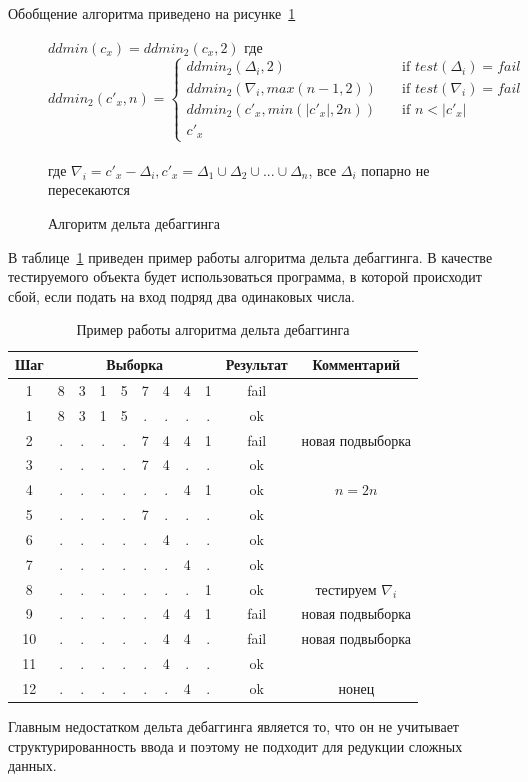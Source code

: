 Обобщение алгоритма приведено на рисунке~\ref{ddminalg}
\begin{figure}
	$ddmin(c_x) = ddmin_2(c_x, 2)$ где \\
\[ ddmin_2(c'_x, n) =
  \begin{cases}
    ddmin_2(\Delta_i, 2)       & \quad \text{if } test(\Delta_i) = fail\\
    ddmin_2(\nabla_i, max(n - 1, 2))       & \quad \text{if } test(\nabla_i) = fail\\
    ddmin_2(c'_x, min(|c'_x|, 2n))       & \quad \text{if } n < |c'_x|\\
    c'_x
  \end{cases}
\]
\\
где $\nabla_i = c'_x - \Delta_i, c'_x = \Delta_1 \cup \Delta_2 \cup ... \cup \Delta_n$, все $\Delta_i$ попарно не пересекаются
\caption{Алгоритм дельта дебаггинга}
\label{ddminalg}
\end{figure}
В таблице~\ref{tab:ddminex2} приведен пример работы алгоритма дельта дебаггинга. В качестве тестируемого объекта будет использоваться программа, в которой происходит сбой, если подать на вход подряд два одинаковых числа.
\begin{table}[]
\center
\caption{\label{tab:ddminex2}Пример работы алгоритма дельта дебаггинга}
\begin{tabular}{| c | *{8}{c} | c | c |}
\hline
\bf Шаг & \multicolumn{8}{|c|}{\bf Выборка} & {\bf Результат} & {\bf Комментарий}\\
\hline
1 &  8 & 3 & 1 & 5 & 7 & 4 & 4 & 1  & fail & \\
\hline
1 &  8 & 3 & 1 & 5 & . & . & . & .  & ok & \\
\hline
2 &  . & . & . & . & 7 & 4 & 4 & 1 & fail & новая подвыборка\\
\hline
3 &  . & . & . & . & 7 & 4 & . & . & ok & \\
\hline
4 &  . & . & . & . & . & . & 4 & 1 & ok & $n = 2n$\\
\hline
5 &  . & . & . & . & 7 & . & . & . & ok & \\
\hline
6 &  . & . & . & . & . & 4 & . & . & ok &\\
\hline
7 &  . & . & . & . & . & . & 4 & . & ok &\\
\hline
8 &  . & . & . & . & . & . & . & 1 & ok &тестируем $\nabla_i$\\
\hline
9 &  . & . & . & . & . & 4 & 4 & 1 & fail &новая подвыборка\\
\hline
10 &  . & . & . & . & . & 4 & 4 & . & fail &новая подвыборка\\
\hline
11 &  . & . & . & . & . & 4 & . & . & ok &\\
\hline
12 &  . & . & . & . & . & . & 4 & . & ok & нонец\\
\hline
\end{tabular}
\end{table}
Главным недостатком дельта дебаггинга является то, что он не учитывает структурированность ввода и поэтому не подходит для редукции сложных данных.
